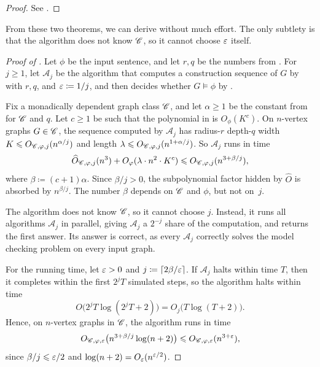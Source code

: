 
\begin{proof}
  See .
\end{proof}

From these two theorems, we can derive
 without much effort.
The only subtlety is that the algorithm does not know $\mathscr C$, so it cannot choose $\varepsilon$ itself.

\mainthm*

\begin{proof}[Proof of ]
  Let $\phi$ be the input sentence, and let $r,q$ be the numbers from .
  For $j\ge1$, let $\mathcal A_j$ be the algorithm that computes a construction sequence of $G$ by  with $r,q$, and $\varepsilon\coloneqq1/j$,
  and then decides whether $G\models\phi$ by .

  Fix a monadically dependent graph class $\mathscr C$, and let $\alpha\ge1$ be the constant from  for $\mathscr C$ and $q$.
  Let $c\ge1$ be such that the polynomial in  is $O_\phi(K^c)$.
  On $n$-vertex graphs $G\in\mathscr C$, the sequence computed by $\mathcal A_j$ has radius-$r$ depth-$q$ width $K\leqslant O_{\mathscr C,\varphi,j}(n^{\alpha/j})$ and length $\lambda\leqslant O_{\mathscr C,\varphi,j}(n^{1+\alpha/j})$.
  So $\mathcal A_j$ runs in time
  \[
    \widehat O_{\mathscr C,\varphi,j}(n^3)+O_\varphi(\lambda\cdot n^2\cdot K^c)
    \leqslant O_{\mathscr C,\varphi,j}(n^{3+\beta/j}),
  \]
  where $\beta\coloneqq(c+1)\alpha$.
  Since $\beta/j>0$, the subpolynomial factor hidden by $\widehat O$ is absorbed by $n^{\beta/j}$.
  The number $\beta$ depends on $\mathscr C$ and $\phi$, but not on~$j$.
  
  The algorithm does not know $\mathscr C$, so it cannot choose $j$.
  Instead, it runs all algorithms $\mathcal A_j$ in parallel, giving $\mathcal A_j$ a $2^{-j}$ share of the computation, and returns the first answer.
  Its answer is correct, as every $\mathcal A_j$ correctly solves the model checking problem on every input graph.


  For the running time, let $\varepsilon>0$ and $j\coloneqq\lceil2\beta/\varepsilon\rceil$.
  If $\mathcal A_j$ halts within time $T$, then it completes within the first $2^jT$ simulated steps, so the algorithm halts within time
  \[
    O\bigl(2^jT\log(2^jT+2)\bigr)=O_j\bigl(T\log(T+2)\bigr).
  \]
  Hence, on $n$-vertex graphs in $\mathscr C$, the algorithm runs in time
  \[
    O_{\mathscr C,\varphi,\varepsilon}\bigl(n^{3+\beta/j}\log(n+2)\bigr)
    \leqslant O_{\mathscr C,\varphi,\varepsilon}(n^{3+\varepsilon}),
  \]
  since $\beta/j\leqslant\varepsilon/2$ and $\log(n+2)=O_\varepsilon(n^{\varepsilon/2})$.
\end{proof}

